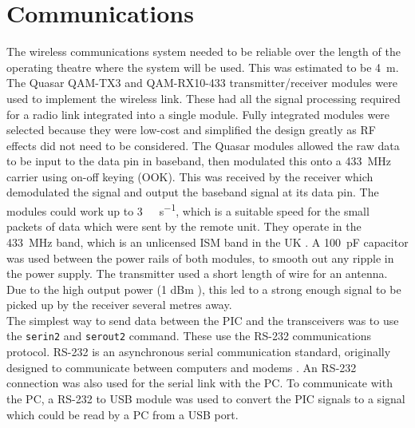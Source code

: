 \section{Communications}

The wireless communications system needed to be reliable over the length of the operating theatre where the system will be used. This was estimated to be \SI{4}{\metre}. The Quasar QAM-TX3 \cite{qam-tx} and QAM-RX10-433 \cite{qam-rx} transmitter/receiver modules were used to implement the wireless link. These had all the signal processing required for a radio link integrated into a single module. Fully integrated modules were selected because they were low-cost and simplified the design greatly as RF effects did not need to be considered. The Quasar modules allowed the raw data to be input to the data pin in baseband, then modulated this onto a \SI{433}{\mega\hertz} carrier using on-off keying (OOK). This was received by the receiver which demodulated the signal and output the baseband signal at its data pin. The modules could work up to \SI{3}{\kilo\bit\per\second}, which is a suitable speed for the small packets of data which were sent by the remote unit. They operate in the \SI{433}{\mega\hertz} band, which is an unlicensed ISM band in the UK \cite{ism_band}. A \SI{100}{\pico\farad} capacitor was used between the power rails of both modules, to smooth out any ripple in the power supply. The transmitter used a short length of wire for an antenna. Due to the high output power (1 dBm \cite{qam-tx}), this led to a strong enough signal to be picked up by the receiver several metres away. \\


The simplest way to send data between the PIC and the transceivers was to use the \verb|serin2| and \verb|serout2| command. These use the RS-232 communications protocol. RS-232 is an asynchronous serial communication standard, originally designed to communicate between computers and modems \cite{rs232}. An RS-232 connection was also used for the serial link with the PC. To communicate with the PC, a RS-232 to USB module was used to convert the PIC signals to a signal which could be read by a PC from a USB port.\\

